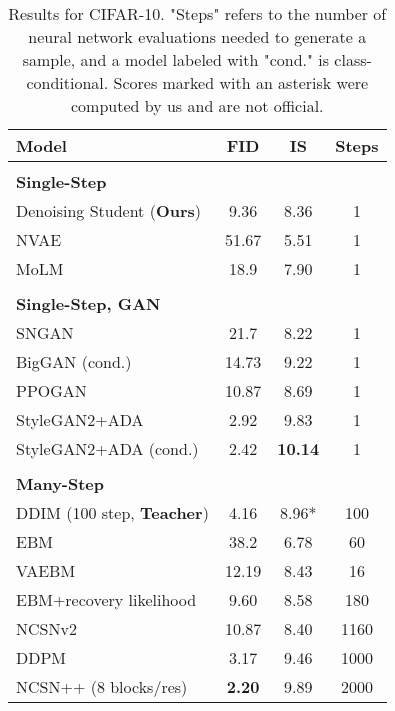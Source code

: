 \documentclass[12pt,a4paper]{article}
\newcommand{\citebracket}[1]{\cite{#1}}
\begin{document}
\begin{table}[t!]
  \parbox{.6\linewidth}{
  	\begin{small}
    \caption{Results for CIFAR-10. "Steps" refers to the number of neural network evaluations needed to generate a sample, and a model labeled with "cond." is class-conditional. Scores marked with an asterisk were computed by us and are not official.} 
    \label{tab:table1}
    \begin{tabular}{l c c c} 
      \\
      Model & FID  & IS  & Steps \\
      \hline \\
      \textbf{Single-Step} \\
      Denoising Student (\textbf{Ours}) & 9.36 & 8.36 & 1 \\
      NVAE \citebracket{nvae} & 51.67 & 5.51 & 1\\
      MoLM \citebracket{molm} & 18.9 & 7.90 & 1 \\
      \\ 
      \textbf{Single-Step, GAN} \\
      SNGAN \citebracket{sngan} & 21.7 & 8.22 & 1 \\
      BigGAN (cond.) \citebracket{biggan} & 14.73 & 9.22 & 1  \\
      PPOGAN \citebracket{ppogan} & 10.87 & 8.69 & 1 \\
      StyleGAN2+ADA \citebracket{stylegan2ada} & 2.92 & 9.83 & 1 \\
      StyleGAN2+ADA (cond.) \citebracket{stylegan2ada} & 2.42 & \textbf{10.14} & 1  \\
      \\
      \textbf{Many-Step} \\ 
      DDIM (100 step, \textbf{Teacher}) & 4.16 & 8.96* & 100 \\
      EBM \citebracket{du2019implicit} & 38.2 & 6.78 & 60 \\
      VAEBM \citebracket{vaebm} & 12.19 & 8.43 & 16  \\
      EBM+recovery likelihood \citebracket{gao2020learning} & 9.60 & 8.58 & 180  \\
      NCSNv2 \citebracket{ncsn2} & 10.87 & 8.40 & 1160  \\
      DDPM \citebracket{ddpm} & 3.17 & 9.46 & 1000  \\
      NCSN++ (8 blocks/res) \citebracket{sde} & \textbf{2.20} & 9.89 & 2000
    \end{tabular}
    \end{small}
}
\end{table}
\end{document}
